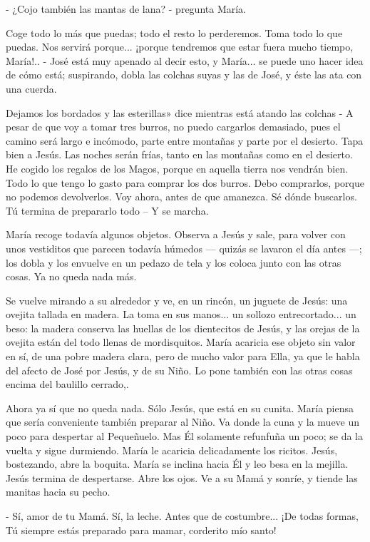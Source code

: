 \documentclass[12pt]{book} %
\begin{document}
- ¿Cojo también las mantas de lana? - pregunta María. 

Coge todo lo más que puedas; todo el resto lo perderemos. Toma todo lo que puedas. Nos servirá porque... ¡porque tendremos que estar fuera mucho tiempo, María!.. - José está muy apenado al decir esto, y María... se puede uno hacer idea de cómo está; suspirando, dobla las colchas suyas y las de José, y éste las ata con una cuerda. 

Dejamos los bordados y las esterillas» dice mientras está atando las colchas - A pesar de que voy a tomar tres burros, no puedo cargarlos demasiado, pues el camino será largo e incómodo, parte entre montañas y parte por el desierto. Tapa bien a Jesús. Las noches serán frías, tanto en las montañas como en el desierto. He cogido los regalos de los Magos, porque en aquella tierra nos vendrán bien. Todo lo que tengo lo gasto para comprar los dos burros. Debo comprarlos, porque no podemos devolverlos. Voy ahora, antes de que amanezca. Sé dónde buscarlos. Tú termina de prepararlo todo – Y se marcha. 

María recoge todavía algunos objetos. Observa a Jesús y sale, para volver con unos vestiditos que parecen todavía húmedos — quizás se lavaron el día antes —; los dobla y los envuelve en un pedazo de tela y los coloca junto con las otras cosas. Ya no queda nada más. 

Se vuelve mirando a su alrededor y ve, en un rincón, un juguete de Jesús: una ovejita tallada en madera. La toma en sus manos... un sollozo entrecortado... un beso: la madera conserva las huellas de los dientecitos de Jesús, y las orejas de la ovejita están del todo llenas de mordisquitos. María acaricia ese objeto sin valor en sí, de una pobre madera clara, pero de mucho valor para Ella, ya que le habla del afecto de José por Jesús, y de su Niño. Lo pone también con las otras cosas encima del baulillo cerrado,. 

Ahora ya sí que no queda nada. Sólo Jesús, que está en su cunita. María piensa que sería conveniente también preparar al Niño. Va donde la cuna y la mueve un poco para despertar al Pequeñuelo. Mas Él solamente refunfuña un poco; se da la vuelta y sigue durmiendo. María le acaricia delicadamente los ricitos. Jesús, bostezando, abre la boquita. María se inclina hacia Él y leo besa en la mejilla. Jesús termina de despertarse. Abre los ojos. Ve a su Mamá y sonríe, y tiende las manitas hacia su pecho. 

- Sí, amor de tu Mamá. Sí, la leche. Antes que de costumbre... ¡De todas formas, Tú siempre estás preparado para mamar, corderito mío santo! 
\end{document}
